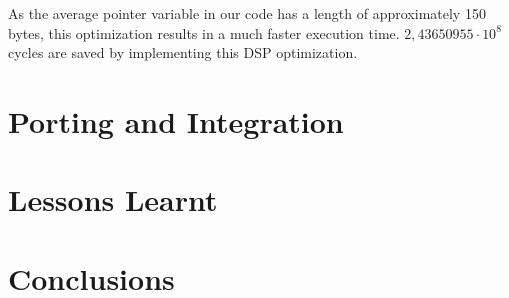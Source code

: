 \documentclass[a4paper]{article}
\begin{document}
	As the average pointer variable in our code has a length of approximately 150 bytes, this optimization results in a much faster execution time. $2,43650955\cdot10^{8}$ cycles are saved by implementing this DSP optimization.
\section{Porting and Integration}

\section{Lessons Learnt}

\section{Conclusions}
\end{document}
